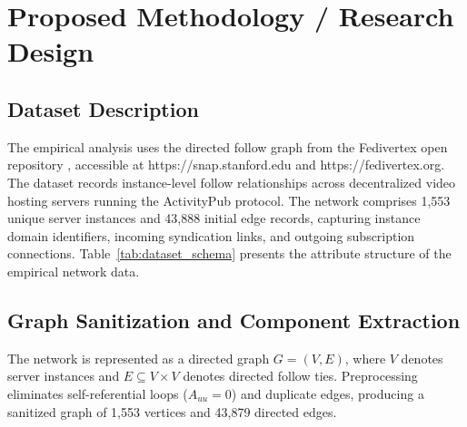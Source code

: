 \documentclass[conference]{IEEEtran}
\begin{document}
\section{Proposed Methodology / Research Design}

\subsection{Dataset Description}
The empirical analysis uses the directed follow graph from the Fedivertex open repository \cite{damie2026fedivertex}, accessible at https://snap.stanford.edu and https://fedivertex.org. The dataset records instance-level follow relationships across decentralized video hosting servers running the ActivityPub protocol. The network comprises 1,553 unique server instances and 43,888 initial edge records, capturing instance domain identifiers, incoming syndication links, and outgoing subscription connections. Table~\ref{tab:dataset_schema} presents the attribute structure of the empirical network data.

\begin{table}[htbp]
\caption{Attribute Schema and Structural Description of the Federated Network Data}
\label{tab:dataset_schema}
\centering
{}
\end{table}

\subsection{Graph Sanitization and Component Extraction}
The network is represented as a directed graph $G = (V, E)$, where $V$ denotes server instances and $E \subseteq V \times V$ denotes directed follow ties. Preprocessing eliminates self-referential loops ($A_{uu} = 0$) and duplicate edges, producing a sanitized graph of 1,553 vertices and 43,879 directed edges.
\end{document}
